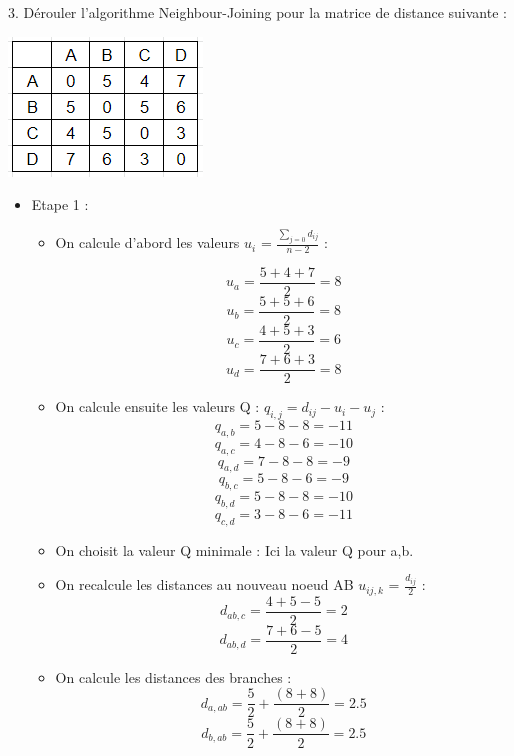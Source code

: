 \documentclass[
	12pt, %
]{fphw}
\begin{document}
\begin{problem}
	3. Dérouler l'algorithme Neighbour-Joining pour la matrice de distance suivante :
\begin{center}
	\includegraphics[width=0.3\columnwidth]{mat1.png}
\end{center}
\end{problem}
\begin{center}
\begin{itemize}
		\item Etape 1 :
			\begin{itemize}
			\item On calcule d'abord les valeurs $u_{i}$ = $\frac{\sum_{ j=0}d_{ij}}{n-2}$ :

				\[ u_{a} = \frac{5+4+7}{2} = 8 \]
				\[ u_{b} = \frac{5+5+6}{2} = 8 \]
				\[ u_{c} = \frac{4+5+3}{2} = 6 \]
				\[ u_{d} = \frac{7+6+3}{2} = 8 \]

			\item On calcule ensuite les valeurs Q : $q_{i,j} = d_{ij} - u_i - u_j$ :
				\[ q_{a,b} = 5-8-8 = -11 \]
				\[ q_{a,c} = 4-8-6 = -10 \]
				\[ q_{a,d} = 7-8-8 = -9 \]
				\[ q_{b,c} = 5-8-6 = -9 \]
				\[ q_{b,d} = 5-8-8 = -10 \]
				\[ q_{c,d} = 3-8-6 = -11 \]
			\item On choisit la valeur Q minimale : Ici la valeur Q pour a,b.

			\item On recalcule les distances au nouveau noeud AB $u_{ij,k}$ = $\frac{d_{ij}}{2}$ :
				\[ d_{ab,c} = \frac{4+5-5}{2} = 2 \]
				\[ d_{ab,d} = \frac{7+6-5}{2} = 4 \]	

			\item On calcule les distances des branches :
				\[ d_{a,ab} = \frac{5}{2} + \frac{(8+8)}{2} = 2.5 \]
				\[ d_{b,ab} = \frac{5}{2} + \frac{(8+8)}{2} = 2.5 \]


\end{itemize}
\end{itemize}
\end{center}
\end{document}

